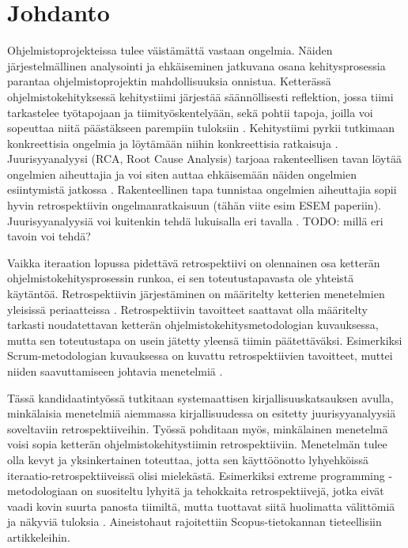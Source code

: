 
\section{Johdanto}

Ohjelmistoprojekteissa tulee väistämättä vastaan ongelmia. Näiden järjestelmällinen analysointi ja ehkäiseminen jatkuvana osana kehitysprosessia parantaa ohjelmistoprojektin mahdollisuuksia onnistua. Ketterässä ohjelmistokehityksessä kehitystiimi järjestää säännöllisesti reflektion, jossa tiimi tarkastelee työtapojaan ja tiimityöskentelyään, sekä pohtii tapoja, joilla voi sopeuttaa niitä päästäkseen parempiin tuloksiin \citep{AgileRetros2006}. Kehitystiimi pyrkii tutkimaan konkreettisia ongelmia ja löytämään niihin konkreettisia ratkaisuja \citep{AgileRetros2006}. Juurisyyanalyysi (RCA, Root Cause Analysis) tarjoaa rakenteellisen tavan löytää ongelmien aiheuttajia ja voi siten auttaa ehkäisemään näiden ongelmien esiintymistä jatkossa \citep{Lehtinen2011}. Rakenteellinen tapa tunnistaa ongelmien aiheuttajia sopii hyvin retrospektiivin ongelmanratkaisuun (tähän viite esim ESEM paperiin). Juurisyyanalyysiä voi kuitenkin tehdä lukuisalla eri tavalla \citep{Lehtinen2011}. TODO: millä eri tavoin voi tehdä?

Vaikka iteraation lopussa pidettävä retrospektiivi on olennainen osa ketterän ohjelmistokehitysprosessin runkoa, ei sen toteutustapavasta ole yhteistä käytäntöä. Retrospektiivin järjestäminen on määritelty ketterien menetelmien yleisissä periaatteissa \citep{AgileManifestoPrinciples}. Retrospektiivin tavoitteet saattavat olla määritelty tarkasti noudatettavan ketterän ohjelmistokehitysmetodologian kuvauksessa, mutta sen toteutustapa on usein jätetty yleensä tiimin päätettäväksi. Esimerkiksi Scrum-metodologian kuvauksessa on kuvattu retrospektiivien tavoitteet, muttei niiden saavuttamiseen johtavia menetelmiä \citep{ScrumGuide2011}.

Tässä kandidaatintyössä tutkitaan systemaattisen kirjallisuuskatsauksen \citep{Kitchenham2010} avulla, minkälaisia menetelmiä aiemmassa kirjallisuudessa on esitetty juurisyyanalyysiä soveltaviin retrospektiiveihin. Työssä pohditaan myös, minkälainen menetelmä voisi sopia ketterän ohjelmistokehitystiimin retrospektiiviin.  Menetelmän tulee olla kevyt ja yksinkertainen toteuttaa, jotta sen käyttöönotto lyhyehköissä iteraatio-retrospektiiveissä olisi mielekästä. Esimerkiksi extreme programming -metodologiaan on suositeltu lyhyitä ja tehokkaita retrospektiivejä, jotka eivät vaadi kovin suurta panosta tiimiltä, mutta tuottavat siitä huolimatta välittömiä ja näkyviä tuloksia \citep{myllyaho2004review}. Aineistohaut rajoitettiin Scopus-tietokannan tieteellisiin artikkeleihin.

